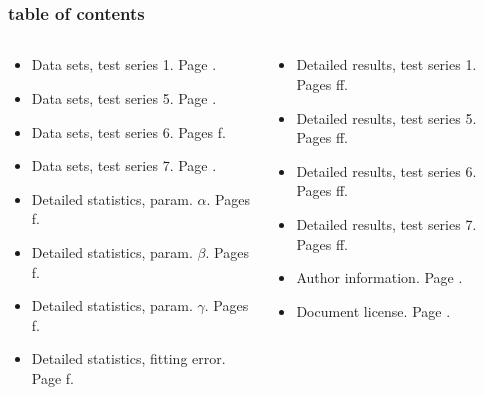 	\section{\appendixname}
	\begin{frame}
		\frametitle{\appendixname{} \textendash{} table of contents}\label{app:toc}
		\small
		\begin{columns}[t]
			\begin{column}{.49\textwidth}
				\begin{itemize}
					\item Data sets, test series 1. Page \pageref{app:dataset:ts1}.
					\item Data sets, test series 5. Page \pageref{app:dataset:ts5}.
					\item Data sets, test series 6. Pages \pageref{app:dataset:ts6}f.
					\item Data sets, test series 7. Page \pageref{app:dataset:ts7}.
					\item Detailed statistics, param. $\alpha$. Pages \pageref{app:detstats:alpha}f.
					\item Detailed statistics, param. $\beta$. Pages \pageref{app:detstats:beta}f.
					\item Detailed statistics, param. $\gamma$. Pages \pageref{app:detstats:gamma}f.
					\item Detailed statistics, fitting error. Page \pageref{app:detstats:error}f.
				\end{itemize}
			\end{column}
			\begin{column}{.49\textwidth}
				\begin{itemize}
					\item Detailed results, test series 1. Pages \pageref{app:details:ts1}ff.
					\item Detailed results, test series 5. Pages \pageref{app:details:ts5}ff.
					\item Detailed results, test series 6. Pages \pageref{app:details:ts6v600}ff.
					\item Detailed results, test series 7. Pages \pageref{app:details:ts7}ff.
					\item Author information. Page \pageref{app:authinfo}.
					\item Document license. Page \pageref{app:doclicense}.
				\end{itemize}
				\vspace*{3em}
			\end{column}
		\end{columns}
	\end{frame}

